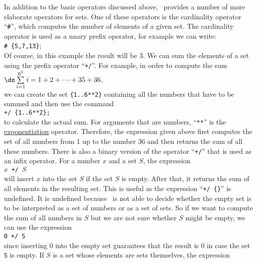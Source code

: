 In addition to the basic operators discussed above,
\setlx\ provides a number of more elaborate operators for sets.  One of these operators is
the cardinality operator ``\texttt{\#}'', which computes the number of elements of a 
given set.  The cardinality operator is used as a unary prefix operator, for example we can write:
\\[0.2cm]
\hspace*{1.3cm}
\texttt{\# \{5,7,13\}};
\\[0.2cm]
Of course, in this example the result will be $3$.
We can sum the elements of a set using the prefix operator
``\texttt{+/}''.  For example, in order to
compute the sum 
\\[0.2cm]
\hspace*{1.3cm}
$\ds\sum\limits_{i=1}^{6^2} i = 1 + 2 + \cdots + 35 + 36$,
\\[0.2cm]
we can create the set \texttt{\{1..6**2\}} containing all the numbers
that have to be summed and then use the command
\\[0.2cm]
\hspace*{1.3cm}
\texttt{+/ \{1..6**2\}; }
\\[0.2cm]
to calculate the actual sum.
For arguments that are numbers, ``\texttt{**}'' is the \href{https://en.wikipedia.org/wiki/Exponentiation}{exponentiation} operator.
Therefore, the expression given above 
first computes the set of all numbers from 1 up to the number 36 and then returns the sum
of all these numbers.  There is also a binary version of the operator ``\texttt{+/}'' that
is used as an infix operator.  For a number $x$ and a set $S$, the expression
\\[0.2cm]
\hspace*{1.3cm}
\texttt{$x$ +/ $S$}
\\[0.2cm]
will insert $x$ into the set $S$ if the set $S$ is empty.  After that, it returns the sum of all elements in the
resulting set.  This is useful as the expression ``\texttt{+/ \{\}}'' is undefined.  It is undefined because
\setlx\ is not able to decide whether the empty set is to be interpreted as a set of numbers or as a set of sets.
So if we want to compute the sum of all numbers in $S$ but we are not sure whether $S$ might
be empty, we can use the expression
\\[0.2cm]
\hspace*{1.3cm}
\texttt{0 +/ S}
\\[0.2cm]
since inserting $0$ into the empty set guarantees that the result is 0 in case  the set
\texttt{S} is empty.  If $S$ is a set whose elements are sets themselves, the expression
